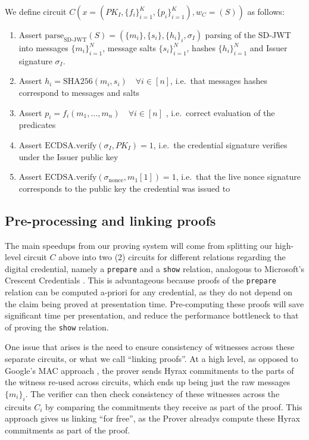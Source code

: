 \begin{mdframed}[style=zkprotocolwithheader, frametitle=Underlying ZK Circuit $C$ for Verifiable Credential]

We define circuit $C(x = (PK_I, \{f_i\}_{i=1}^K, \{p_i\}_{i=1}^K), w_C = (S))$ as follows:

\begin{enumerate}
\item Assert $\text{parse}_{\text{SD-JWT}}(S) = (\{m_i\}, \{s_i\}, \{h_i\}_i, \sigma_I)$ parsing of the SD-JWT into messages $\{m_i\}_{i=1}^N$, message salts $\{s_i\}_{i=1}^N$, hashes $\{h_i\}_{i=1}^N$ and Issuer signature $\sigma_I$.
\item Assert $h_i = \text{SHA256}(m_i, s_i) \quad \forall i \in [n]$, i.e.\ that messages hashes correspond to messages and salts
\item Assert $p_i = f_i(m_1, \dots, m_n) \quad \forall i \in [n]$ , i.e.\ correct evaluation of the predicates
\item Assert $\text{ECDSA.verify}(\sigma_I, PK_I) = 1$, i.e.\ the credential signature verifies under the Issuer public key
\item Assert $\text{ECDSA.verify}(\sigma_{\text{nonce}}, m_1[1]) = 1$, i.e.\ that the live nonce signature corresponds to the public key the credential was issued to
\end{enumerate}

\end{mdframed}

\subsection{Pre-processing and linking proofs}

The main speedups from our proving system will come from splitting our high-level circuit $C$ above into two (2) circuits for different relations regarding the digital credential, 
namely a \texttt{prepare} and a \texttt{show} relation, analogous to Microsoft's Crescent Credentials \cite{cryptoeprint:2024/2013}. 
This is advantageous because proofs of the \texttt{prepare} relation can be computed a-priori for any credential, as they do not depend on the claim being proved at presentation time. 
Pre-computing these proofs will save significant time per presentation, and reduce the performance bottleneck to that of proving the \texttt{show} relation.

One issue that arises is the need to ensure consistency of witnesses across these separate circuits, or what we call ``linking proofs''. 
At a high level, as opposed to Google's MAC approach \cite{cryptoeprint:2024/2010}, the prover sends Hyrax commitments to the parts of the witness re-used across circuits, 
which ends up being just the raw messages $\{m_i\}_i$. 
The verifier can then check consistency of these witnesses across the circuits $C_i$ by comparing the commitments they receive as part of the proof. 
This approach gives us linking ``for free'', as the Prover alreadys compute these Hyrax commitments as part of the proof.

